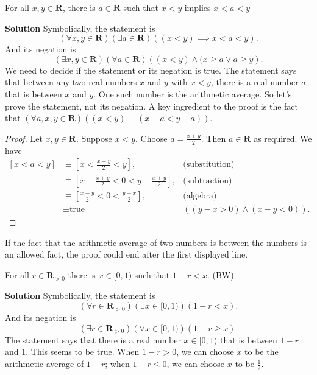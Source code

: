 \documentclass[12pt,fleqn,answers]{exam}
\newcommand{\reals}{\mathbf{R}}
\newenvironment{myproof}
  {\begin{shaded}\begin{proof}}
  {\end{proof}\end{shaded}}
\begin{document}
\begin{questions}




    \question For all $x,y \in \reals$, there is $a \in \reals$ such that
    $x < y$ implies $x<a<y$

    \textbf{Solution} Symbolically, the statement is 
    \begin{equation*}
      \left(\forall x,y \in \reals\right)
      \left(\exists a \in \reals \right)
      \left ((x< y) \implies x < a < y\right).
    \end{equation*}
    And its negation is 
     \begin{equation*}
      \left(\exists x,y \in \reals\right)
      \left(\forall a \in \reals \right)
      \left ((x< y) \land (x \geq a \lor a \geq y \right).
    \end{equation*}
    We need to decide if the statement or its negation is true. The statement says that between any two real 
    numbers $x$ and $y$ with $x < y$, there is  a real number $a$ that is between $x$ and $y$. One such number is the arithmetic average. So   let's prove the statement, not its negation.
     A key ingredient to the proof is the fact that $(\forall a,x,y \in \reals)( (x< y) \equiv (x-a < y-a))$.   
    \begin{myproof}
     Let $x,y \in \reals$. Suppose $x < y$. Choose $a = \frac{x+y}{2}$.
     Then $a \in \reals$ as required. We have
     \begin{align*}
       \left[ x < a < y \right] 
           &\equiv \left[ x < \frac{x+y}{2} < y \right], &\mbox{(substitution)} \\
           & \equiv \left[ x - \frac{x+y}{2} < 0 < y - \frac{x+y}{2}  \right], &\mbox{(subtraction)} \\
           & \equiv \left[ \frac{x-y}{2} < 0 < \frac{y-x}{2}  \right], &\mbox{(algebra)} \\
           & \equiv \mbox{true} &((y-x > 0) \land (x-y < 0)).
     \end{align*} 
      \end{myproof}
     If the fact that the arithmetic average of two numbers is between the numbers is an allowed fact, the proof
     could end after the first displayed line.
     
     \question For all $r \in \reals_{>0}$ there is $x \in [0,1)$ such that $1-r < x$.      \hfill (BW) 
     
       \textbf{Solution} Symbolically, the statement is 
    \begin{equation*}
      \left(\forall r \in \reals_{>0}\right)\left(\exists x \in [0,1)\right)\left(1-r < x\right).
    \end{equation*}
    And its negation is 
     \begin{equation*}
       \left(\exists r \in \reals_{>0}\right)\left(\forall x \in [0,1)\right)\left(1-r \geq  x\right).
    \end{equation*}
     The statement says that there is a real number $x \in [0,1)$ that is between $1-r$ and $1$. This seems
     to be true. When $1-r > 0$, we can choose $x$ to be the arithmetic average of $1-r$; when $1-r \leq 0$,
     we can choose $x$ to be $\frac{1}{2}$.
     

\end{questions}
\end{document}
